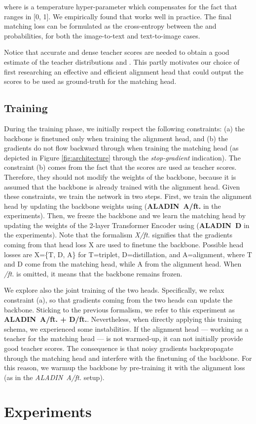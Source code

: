 \documentclass[sigconf]{acmart}
\newcommand{\ourmodel}{ALADIN}    \settopmatter{authorsperrow=4}
\begin{document}
where  is a temperature hyper-parameter which compensates for the fact that  ranges in [0, 1]. We empirically found that  works well in practice.
The final matching loss can be formulated as the cross-entropy between the  and  probabilities, for both the image-to-text and text-to-image cases.


Notice that accurate and dense teacher scores are needed to obtain a good estimate of the teacher distributions  and . This partly motivates our choice of first researching an effective and efficient alignment head that could output the scores to be used as ground-truth for the matching head.

\subsection{Training}
\label{sec:training}

During the training phase, we initially respect the following constraints: (a) the backbone is finetuned only when training the alignment head, and (b) the gradients do not flow backward through  when training the matching head (as depicted in Figure \ref{fig:architecture} through the \textit{stop-gradient} indication). The constraint (b) comes from the fact that the scores  are used as teacher scores. Therefore, they should not modify the weights of the backbone, because it is assumed that the backbone is already trained with the alignment head. Given these constraints, we train the network in two steps. First, we train the alignment head by updating the backbone weights using  (\textbf{\ourmodel\ A/ft.} in the experiments). Then, we freeze the backbone and we learn the matching head by updating the weights of the 2-layer Transformer Encoder using  (\textbf{\ourmodel\ D} in the experiments). Note that the formalism \textit{X/ft.} signifies that the gradients coming from that head loss X are used to finetune the backbone. Possible head losses are X=\{T, D, A\} for T=triplet, D=distillation, and A=alignment, where T and D come from the matching head, while A from the alignment head. When \textit{/ft.} is omitted, it means that the backbone remains frozen.

We explore also the joint training of the two heads. Specifically, we relax constraint (a), so that gradients coming from the two heads can update the backbone. Sticking to the previous formalism, we refer to this experiment as \textbf{\ourmodel\ A/ft. + D/ft.}. Nevertheless, when directly applying this training schema, we experienced some instabilities. If the alignment head --- working as a teacher for the matching head --- is not warmed-up, it can not initially provide good teacher scores. The consequence is that noisy gradients backpropagate through the matching head and interfere with the finetuning of the backbone.
For this reason, we warmup the backbone by pre-training it with the alignment loss  (as in the \textit{\ourmodel\ A/ft.} setup).  \section{Experiments}
\label{sec:experiments}
\end{document}
